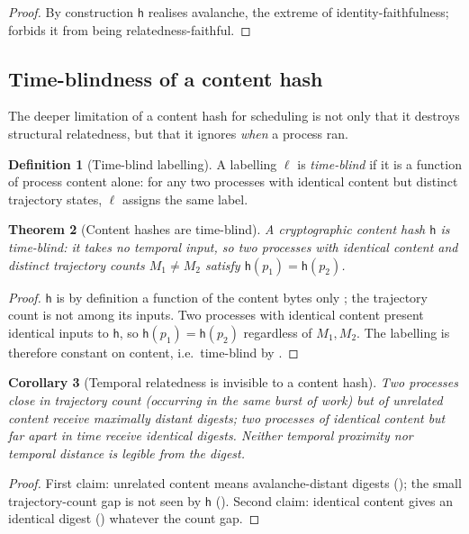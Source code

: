 \documentclass[twocolumn,10pt,a4paper]{article}
\theoremstyle{thmstyle}
\newtheorem{theorem}{Theorem}[section]
\newtheorem{corollary}[theorem]{Corollary}
\theoremstyle{definition}
\newtheorem{definition}[theorem]{Definition}
\theoremstyle{remark}
\newcommand{\Mcount}{M}
\newcommand{\dig}{\mathsf{h}}
\newcommand{\lab}{\ell}
\begin{document}
\begin{proof}
By construction $\dig$ realises avalanche, the extreme of
identity-faithfulness;  forbids it from being
relatedness-faithful.
\end{proof}

\subsection{Time-blindness of a content hash}

The deeper limitation of a content hash for scheduling is not only that it
destroys structural relatedness, but that it ignores \emph{when} a process
ran.

\begin{definition}[Time-blind labelling]
\label{def:timeblind}
A labelling $\lab$ is \emph{time-blind} if it is a function of process
content alone: for any two processes with identical content but distinct
trajectory states, $\lab$ assigns the same label.
\end{definition}

\begin{theorem}[Content hashes are time-blind]
\label{thm:timeblind}
A cryptographic content hash $\dig$ is time-blind: it takes no temporal
input, so two processes with identical content and distinct trajectory
counts $\Mcount_1\neq\Mcount_2$ satisfy $\dig(p_1)=\dig(p_2)$.
\end{theorem}

\begin{proof}
$\dig$ is by definition a function of the content bytes only
\citep{nist180-4,katz2014}; the trajectory count is not among its inputs.
Two processes with identical content present identical inputs to $\dig$,
so $\dig(p_1)=\dig(p_2)$ regardless of $\Mcount_1,\Mcount_2$. The
labelling is therefore constant on content, i.e.\ time-blind by
.
\end{proof}

\begin{corollary}[Temporal relatedness is invisible to a content hash]
\label{cor:no-temporal}
Two processes close in trajectory count (occurring in the same burst of
work) but of unrelated content receive maximally distant digests; two
processes of identical content but far apart in time receive identical
digests. Neither temporal proximity nor temporal distance is legible from
the digest.
\end{corollary}

\begin{proof}
First claim: unrelated content means avalanche-distant digests
(); the small trajectory-count gap is not seen by
$\dig$ (). Second claim: identical content gives an
identical digest () whatever the count gap.
\end{proof}
\end{document}

